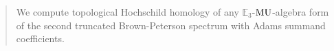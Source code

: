 \begin{abstract}
We compute topological Hochschild homology of any $\mathbb{E}_3$-$\MU$-algebra form of the second truncated Brown-Peterson spectrum with Adams summand coefficients. 
\end{abstract}